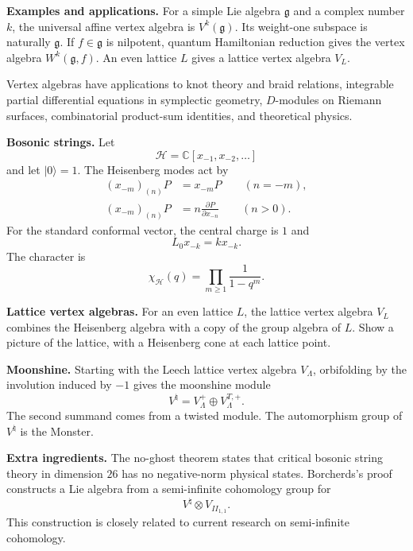 \medskip\noindent
{\bf Examples and applications.}
For a simple Lie algebra $\mathfrak{g}$ and a
complex number $k$, the universal affine
vertex algebra is $V^k(\mathfrak{g})$. Its
weight-one subspace is naturally
$\mathfrak{g}$. If $f\in\mathfrak{g}$ is
nilpotent, quantum Hamiltonian reduction
gives the vertex algebra
$W^k(\mathfrak{g},f)$. An even lattice $L$
gives a lattice vertex algebra
$V_L$.

Vertex algebras have applications to knot
theory and braid relations, integrable
partial differential equations in
symplectic geometry,
$D$-modules on Riemann surfaces,
combinatorial product-sum identities, and
theoretical physics.

\medskip\noindent
{\bf Bosonic strings.}
Let
$$
\mathcal{H}=\mathbb{C}[x_{-1},x_{-2},\ldots]
$$
and let $|0\rangle=1$. The Heisenberg modes
act by
$$
\begin{aligned}
(x_{-m})_{(n)}P&=x_{-m}P\qquad(n=-m),\\
(x_{-m})_{(n)}P&=n
\frac{\partial P}{\partial x_{-n}}
\qquad(n>0).
\end{aligned}
$$
For the standard conformal vector, the
central charge is $1$ and
$$
L_0x_{-k}=kx_{-k}.
$$
The character is
$$
\chi_{\mathcal{H}}(q)=
\prod_{m\geq1}\frac{1}{1-q^m}.
$$

\medskip\noindent
{\bf Lattice vertex algebras.}
For an even lattice $L$, the lattice vertex
algebra $V_L$ combines the Heisenberg algebra
with a copy of the group algebra of $L$.
Show a picture of the lattice, with a
Heisenberg cone at each lattice point.

\medskip\noindent
{\bf Moonshine.}
Starting with the Leech lattice vertex
algebra $V_\Lambda$, orbifolding by the
involution
induced by $-1$ gives the moonshine module
$$
V^{\natural}=V_\Lambda^+
\oplus V_\Lambda^{T,+}.
$$
The second summand comes from a twisted
module.
The automorphism group of $V^{\natural}$ is
the Monster.

\medskip\noindent
{\bf Extra ingredients.}
The no-ghost theorem states that critical
bosonic string theory in dimension $26$ has
no negative-norm physical states. Borcherds's
proof constructs a Lie algebra from a
semi-infinite cohomology group for
$$
V^{\natural}\otimes V_{II_{1,1}}.
$$
This construction is closely related to
current research on semi-infinite cohomology.





